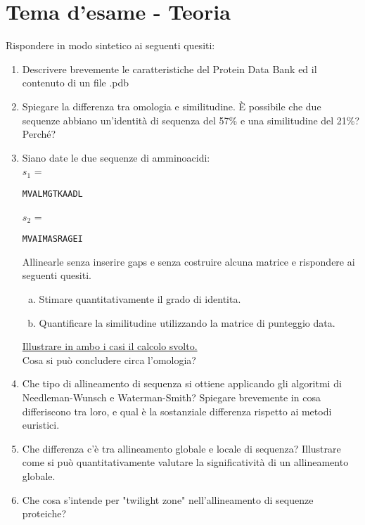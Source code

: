 \documentclass{article}
\begin{document}
\section*{Tema d'esame - Teoria}
Rispondere in modo sintetico ai seguenti quesiti:
\begin{enumerate}[1)]
   \item Descrivere brevemente le caratteristiche del Protein Data Bank ed il contenuto di un file .pdb
   \item Spiegare la differenza tra omologia e similitudine. È possibile che due sequenze abbiano un'identità di sequenza del 57\% e una similitudine del 21\%? Perché?
   \item Siano date le due sequenze di amminoacidi:\\
      $s_{1}$ = \begin{verbatim}MVALMGTKAADL\end{verbatim}
      $s_{2}$ = \begin{verbatim}MVAIMASRAGEI\end{verbatim}
      Allinearle senza inserire gaps e senza costruire alcuna matrice e rispondere ai seguenti quesiti.
      \begin{enumerate}[a)]
         \item Stimare quantitativamente il grado di identita.
         \item Quantificare la similitudine utilizzando la matrice di punteggio data.
      \end{enumerate}
      \underline{Illustrare in ambo i casi il calcolo svolto.}\\
      Cosa si può concludere circa l'omologia?
   \item Che tipo di allineamento di sequenza si ottiene applicando gli algoritmi di Needleman-Wunsch e Waterman-Smith? Spiegare brevemente in cosa differiscono tra loro, e qual è la sostanziale differenza rispetto ai metodi euristici.
   \item Che differenza c'è tra allineamento globale e locale di sequenza? Illustrare come si può quantitativamente valutare la significatività di un allineamento globale.
   \item Che cosa s'intende per "twilight zone" nell'allineamento di sequenze proteiche?
\end{enumerate}
\end{document}
